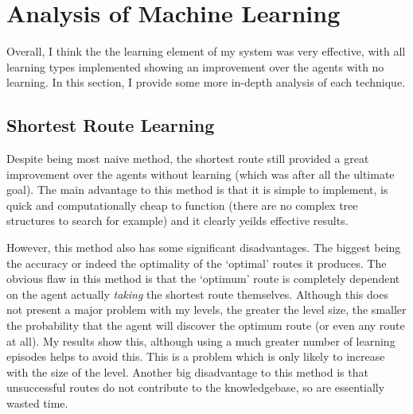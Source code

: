 \documentclass[a4paper,oneside]{report}
\begin{document}
\section{Analysis of Machine Learning}

Overall, I think the the learning element of my system was very effective, with all learning types implemented showing an improvement over the agents with no learning. In this section, I provide some more in-depth analysis of each technique.

\subsection{Shortest Route Learning}

Despite being most naive method, the shortest route still provided a great improvement over the agents without learning (which was after all the ultimate goal). The main advantage to this method is that it is simple to implement, is quick and computationally cheap to function (there are no complex tree structures to search for example) and it clearly yeilds effective results. 

However, this method also has some significant disadvantages. The biggest being the accuracy or indeed the optimality of the `optimal' routes it produces. The obvious flaw in this method is that the `optimum' route is completely dependent on the agent actually \emph{taking} the shortest route themselves. Although this does not present a major problem with my levels, the greater the level size, the smaller the probability that the agent will discover the optimum route (or even any route at all). My results show this, although using a much greater number of learning episodes helps to avoid this. This is a problem which is only likely to increase with the size of the level. Another big disadvantage to this method is that unsuccessful routes do not contribute to the knowledgebase, so are essentially wasted time. 
\end{document}
